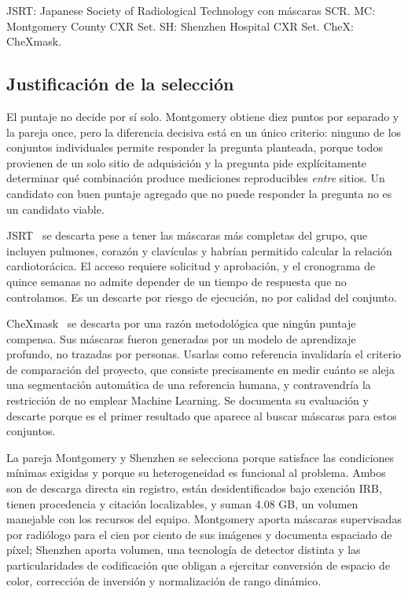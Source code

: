 \documentclass[12pt,a4paper]{article}
\begin{document}
\noindent JSRT: Japanese Society of Radiological Technology con máscaras SCR.
MC: Montgomery County CXR Set. SH: Shenzhen Hospital CXR Set. CheX: CheXmask.

\subsection{Justificación de la selección}

El puntaje no decide por sí solo. Montgomery obtiene diez puntos por separado y la
pareja once, pero la diferencia decisiva está en un único criterio: ninguno de los
conjuntos individuales permite responder la pregunta planteada, porque todos
provienen de un solo sitio de adquisición y la pregunta pide explícitamente
determinar qué combinación produce mediciones reproducibles \emph{entre} sitios.
Un candidato con buen puntaje agregado que no puede responder la pregunta no es un
candidato viable.

JSRT~\cite{shiraishi2000,vanginneken2006} se descarta pese a tener las máscaras más completas del grupo, que incluyen
pulmones, corazón y clavículas y habrían permitido calcular la relación
cardiotorácica. El acceso requiere solicitud y aprobación, y el cronograma de quince
semanas no admite depender de un tiempo de respuesta que no controlamos. Es un
descarte por riesgo de ejecución, no por calidad del conjunto.

CheXmask~\cite{gaggion2024} se descarta por una razón metodológica que ningún puntaje compensa. Sus
máscaras fueron generadas por un modelo de aprendizaje profundo, no trazadas por
personas. Usarlas como referencia invalidaría el criterio de comparación del
proyecto, que consiste precisamente en medir cuánto se aleja una segmentación
automática de una referencia humana, y contravendría la restricción de no emplear
Machine Learning. Se documenta su evaluación y descarte porque es el primer
resultado que aparece al buscar máscaras para estos conjuntos.

La pareja Montgomery y Shenzhen se selecciona porque satisface las condiciones
mínimas exigidas y porque su heterogeneidad es funcional al problema. Ambos son de
descarga directa sin registro, están desidentificados bajo exención IRB, tienen
procedencia y citación localizables, y suman 4.08 GB, un volumen manejable con los
recursos del equipo. Montgomery aporta máscaras supervisadas por radiólogo para el
cien por ciento de sus imágenes y documenta espaciado de píxel; Shenzhen aporta
volumen, una tecnología de detector distinta y las particularidades de codificación
que obligan a ejercitar conversión de espacio de color, corrección de inversión y
normalización de rango dinámico.
\end{document}
